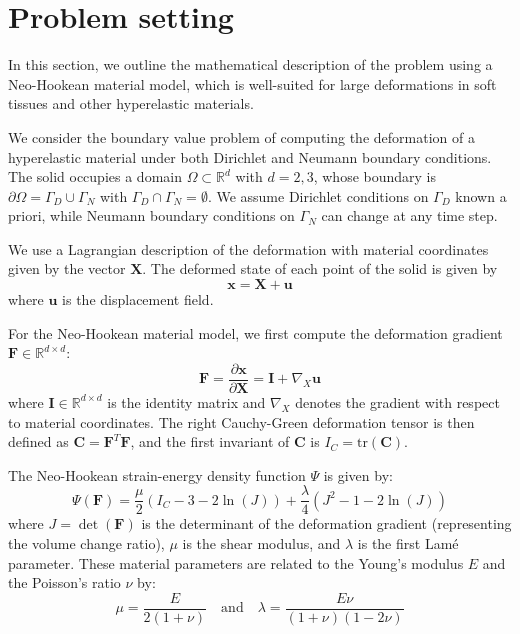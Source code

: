 \section{Problem setting}
\label{sec:problem_setting}

In this section, we outline the mathematical description of the problem using a Neo-Hookean material model, which is well-suited for large deformations in soft tissues and other hyperelastic materials.

We consider the boundary value problem of computing the deformation of a hyperelastic material under both Dirichlet and Neumann boundary conditions. The solid occupies a domain $\Omega \subset \mathbb{R}^d$ with $d=2,3$, whose boundary is $\partial\Omega = \Gamma_D \cup \Gamma_N$ with $\Gamma_D \cap \Gamma_N = \emptyset$. We assume Dirichlet conditions on $\Gamma_D$ known a priori, while Neumann boundary conditions on $\Gamma_N$ can change at any time step.

We use a Lagrangian description of the deformation with material coordinates given by the vector $\bm{X}$. The deformed state of each point of the solid is given by
\begin{equation}
    \bm{x} = \bm{X} + \bm{u}
\label{eq:deformation}
\end{equation}
where $\bm{u}$ is the displacement field.

For the Neo-Hookean material model, we first compute the deformation gradient $\bm{F} \in \mathbb{R}^{d\times d}$:
\begin{equation}
    \bm{F} = \frac{\partial \bm{x}}{\partial \bm{X}} = \bm{I} + \nabla_X \bm{u}
\label{eq:deformation_gradient}
\end{equation}
where $\bm{I} \in \mathbb{R}^{d\times d}$ is the identity matrix and $\nabla_X$ denotes the gradient with respect to material coordinates. The right Cauchy-Green deformation tensor is then defined as $\bm{C} = \bm{F}^T\bm{F}$, and the first invariant of $\bm{C}$ is $I_C = \text{tr}(\bm{C})$.

The Neo-Hookean strain-energy density function $\Psi$ is given by:
\begin{equation}
    \Psi(\bm{F}) = \frac{\mu}{2} (I_C - 3 - 2\ln(J)) + \frac{\lambda}{4} (J^2 - 1 - 2\ln(J))
\label{eq:neo_hookean_energy}
\end{equation}
where $J = \det(\bm{F})$ is the determinant of the deformation gradient (representing the volume change ratio), $\mu$ is the shear modulus, and $\lambda$ is the first Lamé parameter. These material parameters are related to the Young's modulus $E$ and the Poisson's ratio $\nu$ by:
\begin{equation}
    \mu = \frac{E}{2(1+\nu)} \quad \text{and} \quad \lambda = \frac{E\nu}{(1+\nu)(1-2\nu)}
\end{equation}

